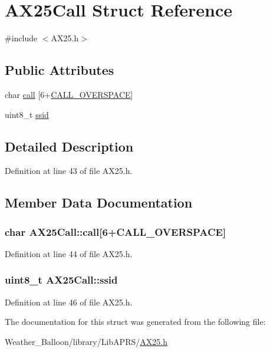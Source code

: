 \hypertarget{struct_a_x25_call}{}\section{A\+X25\+Call Struct Reference}
\label{struct_a_x25_call}


{\ttfamily \#include $<$A\+X25.\+h$>$}

\subsection*{Public Attributes}
\begin{DoxyCompactItemize}
\item 
char \hyperlink{struct_a_x25_call_a6700a0ae4644c06bf1637e9cf91f48ce}{call} \mbox{[}6+\hyperlink{_a_x25_8h_a52717a0e06746d47ce30bc51123ff655}{C\+A\+L\+L\+\_\+\+O\+V\+E\+R\+S\+P\+A\+CE}\mbox{]}
\item 
uint8\+\_\+t \hyperlink{struct_a_x25_call_aab01f56f5e1cd0599dcf01f6a65b2415}{ssid}
\end{DoxyCompactItemize}


\subsection{Detailed Description}


Definition at line 43 of file A\+X25.\+h.



\subsection{Member Data Documentation}
\subsubsection[{\texorpdfstring{call}{call}}]{\setlength{\rightskip}{0pt plus 5cm}char A\+X25\+Call\+::call\mbox{[}6+{\bf C\+A\+L\+L\+\_\+\+O\+V\+E\+R\+S\+P\+A\+CE}\mbox{]}}\hypertarget{struct_a_x25_call_a6700a0ae4644c06bf1637e9cf91f48ce}{}\label{struct_a_x25_call_a6700a0ae4644c06bf1637e9cf91f48ce}


Definition at line 44 of file A\+X25.\+h.

\subsubsection[{\texorpdfstring{ssid}{ssid}}]{\setlength{\rightskip}{0pt plus 5cm}uint8\+\_\+t A\+X25\+Call\+::ssid}\hypertarget{struct_a_x25_call_aab01f56f5e1cd0599dcf01f6a65b2415}{}\label{struct_a_x25_call_aab01f56f5e1cd0599dcf01f6a65b2415}


Definition at line 46 of file A\+X25.\+h.



The documentation for this struct was generated from the following file\+:\begin{DoxyCompactItemize}
\item 
Weather\+\_\+\+Balloon/library/\+Lib\+A\+P\+R\+S/\hyperlink{_a_x25_8h}{A\+X25.\+h}\end{DoxyCompactItemize}

